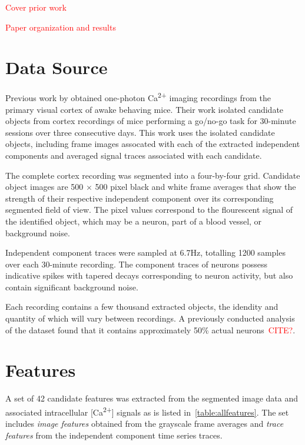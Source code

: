 \documentclass[10pt]{article}
\newcommand{\calcium}[0]{Ca\textsuperscript{2+}}
\newcommand{\todo}[1]{\textcolor{red}{#1}}
\begin{document}
\todo{Cover prior work}

\todo{Paper organization and results}


\section{Data Source}

Previous work by \citeauthor{Mukamel2009} obtained one-photon {\calcium} imaging recordings from the primary visual cortex of awake behaving mice.
Their work isolated candidate objects from cortex recordings of mice performing a go/no-go task for \num{30}-minute sessions over three consecutive days.
This work uses the isolated candidate objects, including frame images assocated with each of the extracted independent components and averaged signal traces associated with each candidate.

The complete cortex recording was segmented into a four-by-four grid.
Candidate object images are \num{500} $\times$ \num{500} pixel black and white frame averages that show the strength of their respective independent component over its corresponding segmented field of view. 
The pixel values correspond to the flourescent signal of the identified object, which may be a neuron, part of a blood vessel, or background noise.

Independent component traces were sampled at \num{6.7}\si{Hz}, totalling \num{1200} samples over each \num{30}-minute recording. The component traces of neurons possess indicative spikes with tapered decays corresponding to neuron activity, but also contain significant background noise.

Each recording contains a few thousand extracted objects, the idendity and quantity of which will vary between recordings.
A previously conducted analysis of the dataset found that it contains approximately 50\% actual neurons~\todo{CITE?}.

\section{Features}

A set of \num{42} candidate features was extracted from the segmented image data and associated intracellular [\calcium] signals as is listed in~\cref{table:allfeatures}.
The set includes \emph{image features} obtained from the grayscale frame averages and \emph{trace features} from the independent component time series traces.
\end{document}
